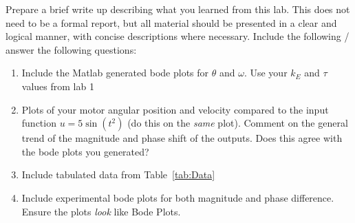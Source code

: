 Prepare a brief write up describing what you learned from this lab. This does not
need to be a formal report, but all material should be presented in a clear and logical manner,
with concise descriptions where necessary. Include the following / answer the following questions:
\begin{enumerate}
\item Include the Matlab generated bode plots for $\theta$ and $\omega$. Use your $k_E$ and $\tau$ values
from lab 1
\item Plots of your motor angular position and velocity compared to the input function $u =  5\sin(t^2)$ (do this on the \emph{same} plot).
Comment on the general trend of the magnitude and phase shift of the outputs. Does this agree
with the bode plots you generated?
\item Include tabulated data from Table~\ref{tab:Data}
\item Include experimental bode plots for both magnitude and phase difference. Ensure the plots \emph{look} like Bode Plots.
\end{enumerate}

